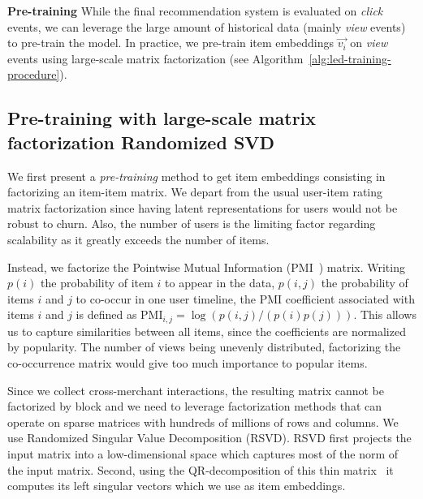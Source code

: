 \documentclass[sigconf]{acmart}
\begin{document}
\textbf{Pre-training} While the final recommendation system is evaluated on \emph{click} events, we can leverage the large amount of historical data (mainly \emph{view} events) to pre-train the model. In practice, we pre-train item embeddings $ \vec{v_i} $ on \emph{view} events using large-scale matrix factorization (see Algorithm~\ref{alg:led-training-procedure}). 

\subsection{Pre-training with large-scale matrix factorization Randomized SVD}
\label{subsec:matrix-fatorization-with-randomized-svd}

We first present a \emph{pre-training} method to get item embeddings consisting in factorizing an item-item matrix. We depart from the usual user-item rating matrix factorization since having latent representations for users would not be robust to churn. Also, the number of users is the limiting factor regarding scalability as it greatly exceeds the number of items.

Instead, we factorize the Pointwise Mutual Information (PMI~\cite{pmi-bouma-2009}) matrix.  Writing $ p(i) $ the probability of item $ i $ to appear in the data, $ p(i, j) $ the probability of items $ i $ and $ j $ to co-occur in one user timeline, the PMI coefficient associated with items $ i $ and $ j $ is defined as $ \text{PMI}_{i,j} = \log (p(i, j)/\left(p(i)p(j) \right))$. This allows us to capture similarities between all items, since the coefficients are normalized by popularity. The number of views being unevenly distributed, factorizing the co-occurrence matrix would give too much importance to popular items. 











Since we collect cross-merchant interactions, the resulting matrix cannot be factorized by block and we need to leverage factorization methods that can operate on sparse matrices with hundreds of millions of rows and columns. We use Randomized Singular Value Decomposition (RSVD). RSVD first projects the input matrix into a low-dimensional space which captures most of the norm of the input matrix. Second, using the QR-decomposition of this thin matrix~\cite{constantine-2011} it computes its left singular vectors which we use as item embeddings. 
\end{document}
